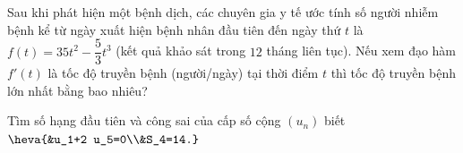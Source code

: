 \begin{ex}%
	Sau khi phát hiện một bệnh dịch, các chuyên gia y tế ước tính số người nhiễm bệnh kể từ ngày xuất hiện bệnh nhân đầu tiên đến ngày thứ $t$ là $f(t)=35 t^2-\dfrac{5}{3} t^3$ (kết quả khảo sát trong $12$ tháng liên tục). Nếu xem đạo hàm $f'(t)$ là tốc độ truyền bệnh (người/ngày) tại thời điểm $t$ thì tốc độ truyền bệnh lớn nhất bằng bao nhiêu?
\end{ex}

\begin{bt}%
	Tìm số hạng đầu tiên và công sai của cấp số cộng $(u_n)$ biết $\heva{&u_1+2 u_5=0\\&S_4=14.}$
\end{bt}

